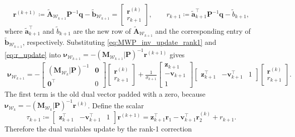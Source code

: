 \documentclass[a4paper,12pt,openany]{book}
\newcommand{\A}{\mathbf{A}}
\newcommand{\M}{\mathbf{M}}
\renewcommand{\P}{\mathbf{P}}
\renewcommand{\a}{\mathbf{a}}
\renewcommand{\b}{\mathbf{b}}
\newcommand{\q}{\mathbf{q}}
\renewcommand{\v}{\mathbf{v}}
\newcommand{\z}{\mathbf{z}}
\begin{document}
\begin{appendices}
\begin{equation}
	\label{eq:r_update}
	\mathbf{r}^{(k+1)}
	\coloneqq
	\tilde{\A}_{\mathcal{W}_{k+1}}\P^{-1}\q - \tilde{\b}_{\mathcal{W}_{k+1}}
	=
	\begin{bmatrix}
		\mathbf{r}^{(k)} \\ r_{k+1}
	\end{bmatrix},
	\qquad
	r_{k+1}\coloneqq \tilde{\a}_{k+1}^\top\P^{-1}\q - \tilde{b}_{k+1},
\end{equation}
where $\tilde{\a}_{k+1}^\top$ and $\tilde{b}_{k+1}$ are the new row of $\tilde{\A}_{\mathcal{W}_{k+1}}$ and the corresponding entry of $\tilde{\b}_{\mathcal{W}_{k+1}}$, respectively. Substituting \eqref{eq:MWP_inv_update_rank1} and \eqref{eq:r_update} into $\boldsymbol{\nu}_{\mathcal{W}_{k+1}}=-(\M_{\mathcal{W}_{k+1}}|\P)^{-1}\mathbf{r}^{(k+1)}$ gives
\begin{multline}
	\boldsymbol{\nu}_{\mathcal{W}_{k+1}}
	=
	-
	\begin{bmatrix}
		(\M_{\mathcal{W}_{k}}|\P)^{-1} & \mathbf{0} \\
		\mathbf{0}^\top & 0
	\end{bmatrix}
	\begin{bmatrix}
		\mathbf{r}^{(k)} \\ r_{k+1}
	\end{bmatrix}
	+
	\frac{1}{\sigma_{k+1}}
	\begin{bmatrix}
		\z_{k+1} \\ -\v_{k+1} \\ 1
	\end{bmatrix}
	\begin{bmatrix}
		\z_{k+1}^\top & -\v_{k+1}^\top & 1
	\end{bmatrix}
	\begin{bmatrix}
		\mathbf{r}^{(k)} \\ r_{k+1}
	\end{bmatrix}.
\end{multline}
The first term is the old dual vector padded with a zero, because $\boldsymbol{\nu}_{\mathcal{W}_k}=-(\M_{\mathcal{W}_{k}}|\P)^{-1}\mathbf{r}^{(k)}$. Define the scalar
\begin{equation}
	\label{eq:tau_update}
	\tau_{k+1}
	\coloneqq
	\begin{bmatrix}
		\z_{k+1}^\top & -\v_{k+1}^\top & 1
	\end{bmatrix}
	\mathbf{r}^{(k+1)}
	=
	\z_{k+1}^\top\mathbf{r}_1 - \v_{k+1}^\top\mathbf{r}_2^{(k)} + r_{k+1}.
\end{equation}
Therefore the dual variables update by the rank-1 correction

\end{appendices}
\end{document}
